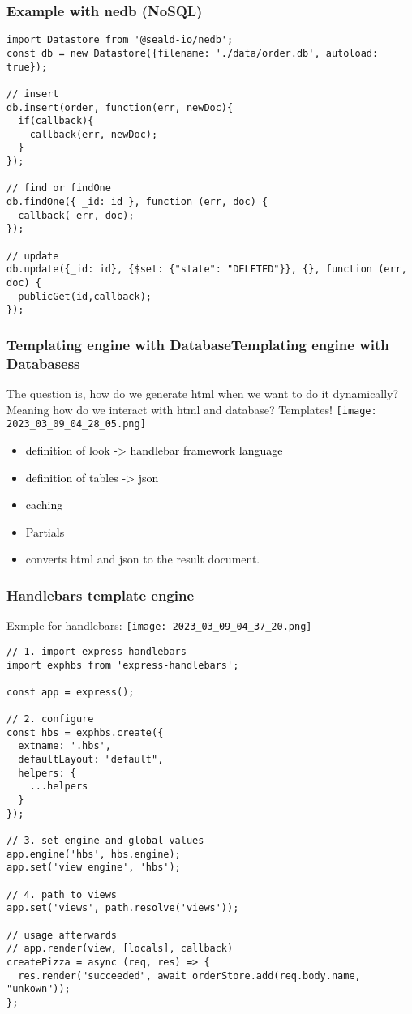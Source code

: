 \documentclass[main.tex,fontsize=8pt,paper=a4,paper=portrait,DIV=calc,]{scrartcl}
\begin{document}
\subsubsection{Example with nedb (NoSQL)}
\begin{lstlisting}
import Datastore from '@seald-io/nedb';
const db = new Datastore({filename: './data/order.db', autoload: true});

// insert 
db.insert(order, function(err, newDoc){
  if(callback){
    callback(err, newDoc);
  }
});

// find or findOne
db.findOne({ _id: id }, function (err, doc) {
  callback( err, doc);
});

// update 
db.update({_id: id}, {$set: {"state": "DELETED"}}, {}, function (err, doc) {
  publicGet(id,callback);
});
\end{lstlisting}

\subsubsection{Templating engine with DatabaseTemplating engine with Databasess}
The question is, how do we generate html when we want to do it dynamically? \newline
Meaning how do we interact with html and database? Templates!\newline
\texttt{[image: 2023\_03\_09\_04\_28\_05.png]}
\begin{itemize}
\item \textcolor{black}{definition of look -> handlebar framework language}
\item \textcolor{black}{definition of tables -> json}
\item \textcolor{black}{caching}
\item \textcolor{black}{Partials}
\item converts html and json to the result document.
\end{itemize} 

\subsubsection{Handlebars template engine}
Exmple for handlebars: \newline
\texttt{[image: 2023\_03\_09\_04\_37\_20.png]}\newline
\begin{lstlisting}
// 1. import express-handlebars
import exphbs from 'express-handlebars';

const app = express();

// 2. configure
const hbs = exphbs.create({
  extname: '.hbs',
  defaultLayout: "default",
  helpers: {
    ...helpers
  }
});

// 3. set engine and global values
app.engine('hbs', hbs.engine);
app.set('view engine', 'hbs');

// 4. path to views
app.set('views', path.resolve('views'));

// usage afterwards
// app.render(view, [locals], callback)
createPizza = async (req, res) => {
  res.render("succeeded", await orderStore.add(req.body.name, "unkown"));
};
\end{lstlisting}
\end{document}
